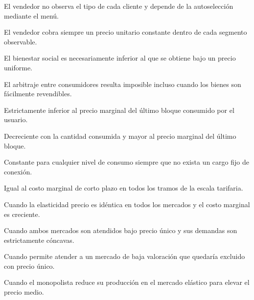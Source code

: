\begin{opts}
    \item El vendedor no observa el tipo de cada cliente y depende de la autoselección mediante el menú.
    \item El vendedor cobra siempre un precio unitario constante dentro de cada segmento observable.
    \item El bienestar social es necesariamente inferior al que se obtiene bajo un precio uniforme.
    \item El arbitraje entre consumidores resulta imposible incluso cuando los bienes son fácilmente revendibles.
\end{opts}

\begin{opts}
    \item Estrictamente inferior al precio marginal del último bloque consumido por el usuario.
    \item Decreciente con la cantidad consumida y mayor al precio marginal del último bloque.
    \item Constante para cualquier nivel de consumo siempre que no exista un cargo fijo de conexión.
    \item Igual al costo marginal de corto plazo en todos los tramos de la escala tarifaria.
\end{opts}

\begin{opts}
    \item Cuando la elasticidad precio es idéntica en todos los mercados y el costo marginal es creciente.
    \item Cuando ambos mercados son atendidos bajo precio único y sus demandas son estrictamente cóncavas.
    \item Cuando permite atender a un mercado de baja valoración que quedaría excluido con precio único.
    \item Cuando el monopolista reduce su producción en el mercado elástico para elevar el precio medio.
\end{opts}

